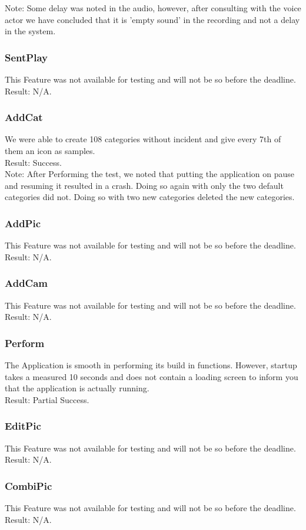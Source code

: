 Note: Some delay was noted in the audio, however, after consulting with the voice actor we have concluded that it is 'empty sound' in the recording and not a delay in the system.

\subsubsection*{SentPlay}
This Feature was not available for testing and will not be so before the deadline.\\

Result: N/A.

\subsubsection*{AddCat}
We were able to create 108 categories without incident and give every 7th of them an icon as samples.\\

Result: Success.\\

Note: After Performing the test, we noted that putting the application on pause and resuming it resulted in a crash. Doing so again with only the two default categories did not. Doing so with two new categories deleted the new categories.

\subsubsection*{AddPic}
This Feature was not available for testing and will not be so before the deadline.\\

Result: N/A.

\subsubsection*{AddCam}
This Feature was not available for testing and will not be so before the deadline.\\

Result: N/A.

\subsubsection*{Perform}
The Application is smooth in performing its build in functions.
However, startup takes a measured  10 seconds and does not contain a loading screen to inform you that the application is actually running.\\

Result: Partial Success.

\subsubsection*{EditPic}
This Feature was not available for testing and will not be so before the deadline.\\

Result: N/A.

\subsubsection*{CombiPic}
This Feature was not available for testing and will not be so before the deadline.\\

Result: N/A.